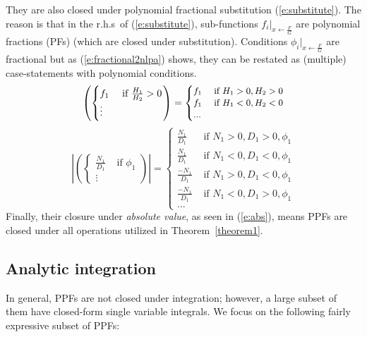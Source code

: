 \documentclass[letterpaper]{article}
\newcommand{\case}[2]{#2 &\text{ if } #1}%
\begin{document}
%
They are also closed under polynomial fractional substitution (\ref{e:substitute}). 
The reason is that in the r.h.s\ of (\ref{e:substitute}), 
sub-functions $f_i |_{x \leftarrow \frac{F}{G}}$ are polynomial fractions (PFs) 
(which are closed under substitution).
Conditions ${\phi_i}|_{x \leftarrow \frac{F}{G}}$ are fractional but as
(\ref{e:fractional2nlpa}) shows, 
they can be restated as (multiple) case-statements with polynomial conditions. 
\\
{\scriptsize
\vspace{3mm}
\begin{equation} 
\label{e:fractional2nlpa}
\left(
 \begin{cases}
  \case{\frac{H_1}{H_2} > 0}{f_1} \\
   \vdots
 \end{cases} 
\right)
 =
{\footnotesize
\begin{cases}
  \case{H_1 > 0, H_2 > 0 }{f_1} \\ 
  \case{H_1 < 0, H_2 < 0}{f_1} \\ 
  ...
 \end{cases} 
}
\end{equation}
\begin{equation}\label{e:abs}
\left|
\left(
  \begin{cases}
  \case{\phi_1}{\frac{N_1}{D_1}}\\
  \vdots
  \end{cases}
\right)
\right|
=
  \begin{cases}
  \case{N_1>0, D_1>0,\phi_1}{\frac{N_1}{D_1}} \\
\case{N_1<0, D_1<0,\phi_1}{\frac{N_1}{D_1}} \\
\case{N_1>0, D_1<0,\phi_1}{\frac{-N_1}{D_1}} \\
\case{N_1<0, D_1>0,\phi_1}{\frac{-N_1}{D_1}} \\
...
 \end{cases}
\end{equation}
}
Finally, their closure under \emph{absolute value}, as seen in  (\ref{e:abs}), 
means PPFs are closed under all operations utilized in Theorem~\ref{theorem1}.

\subsection{Analytic integration}
In general, PPFs are not closed under integration; however, a large subset of them 
 have closed-form single variable integrals.
We focus on the following fairly expressive  subset of PPFs:
\end{document}
